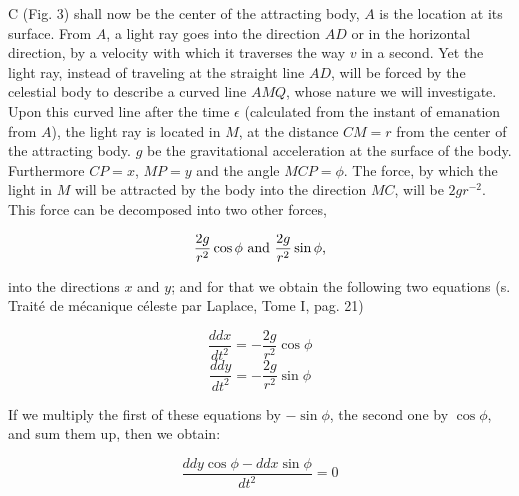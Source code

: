 \documentclass{article}
\begin{document}
C (Fig. 3) shall now be the center of the attracting body, $A$ is the location at its surface. From $A$, a light ray goes into the direction $AD$ or in the horizontal direction, by a velocity with which it traverses the way $v$ in a second. Yet the light ray, instead of traveling at the straight line $AD$, will be forced by the celestial body to describe a curved line $AMQ$, whose nature we will investigate. Upon this curved line after the time $\epsilon$ (calculated from the instant of emanation from $A$), the light ray is located in $M$, at the distance $CM = r$ from the center of the attracting body. $g$ be the gravitational acceleration at the surface of the body. Furthermore $CP = x$, $MP = y$ and the angle $MCP = \phi$. The force, by which the light in $M$ will be attracted by the body into the direction $MC$, will be $2gr^{-2}$. This force can be decomposed into two other forces,

$$\frac{2g}{r^{2}} \cos \phi \textnormal{ and } \frac{2g}{r^{2}} \sin \phi \textnormal{,}$$

into the directions $x$ and $y$; and for that we obtain the following two equations (s. Traité de mécanique céleste par Laplace, Tome I, pag. 21)

\begin{equation}
  \frac{ddx}{dt^{2}} = -\frac{2g}{r^{2}} \cos\phi
\end{equation}
\begin{equation}
  \frac{ddy}{dt^{2}} = -\frac {2g}{r^{2}} \sin\phi
\end{equation}

If we multiply the first of these equations by $-\sin\phi$, the second one by $\cos\phi$, and sum them up, then we obtain:

\begin{equation}
  \frac{ddy\cos\phi -ddx\sin\phi}{dt^{2}} = 0
\end{equation}



\end{document}
